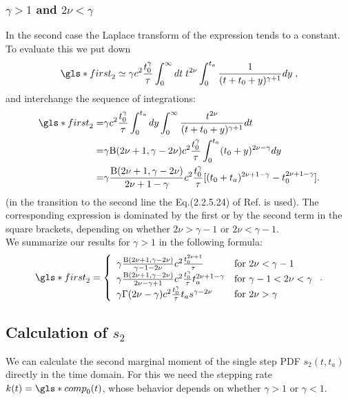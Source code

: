 \subsubsection{$\gamma>1$ and $2\nu < \gamma$}
In the second case the Laplace transform of the expression tends to a constant. To evaluate this we put down 
\begin{equation}
 \gls*{first}_2 \simeq  \gamma c^2 \frac{t_0^\gamma}{\tau} \int_0^\infty dt \; t^{2\nu} \int_0^{t_a} \frac{1}{(t+t_0+y)^{\gamma+1}} dy \; ,
\end{equation}
and interchange the sequence of integrations:
\begin{align}
 \gls*{first}_2 =& \gamma c^2 \frac{ t_0^\gamma}{\tau} \int_0^{t_a} dy \int_0^\infty \frac{t^{2\nu}}{(t+t_0+y)^{\gamma+1}} dt \nonumber \\
 =& \gamma \mathrm{B}(2\nu+1,\gamma - 2\nu) c^2 \frac{ t_0^\gamma}{\tau}  \int_0^{t_a} (t_0+y)^{2\nu -\gamma} dy \nonumber \\
 =& \gamma  \frac{\mathrm{B}(2\nu+1,\gamma - 2\nu) }{2 \nu +1- \gamma } c^2 \frac{t_0^\gamma}{\tau} [(t_0+t_a)^{2\nu +1- \gamma }-t_0^{2\nu+1 - \gamma }]. \nonumber
\end{align}
%
(in the transition to the second line the Eq.(2.2.5.24) of Ref. 
\cite{BryPr} 
is used). The corresponding expression is dominated by the first or by the second term in the square 
brackets, depending on whether $2\nu > \gamma -1$ or $2\nu < \gamma -1$. \\
We summarize our results for $\gamma > 1$ in the following formula:
\begin{equation}
 \gls*{first}_2 = \left\{
 \begin{array}{ll}
   \gamma \frac{\mathrm{B}(2\nu+1,\gamma - 2\nu)}{ \gamma -1 - 2 \nu} c^2 \frac{  t_0^{2\nu +1}}{\tau}  & \mbox{for } 2\nu < \gamma -1 \\
  \gamma \frac{\mathrm{B}(2\nu+1,\gamma - 2\nu)}{2 \nu - \gamma +1} c^2 \frac{ t_0^\gamma}{\tau} t_a^{2\nu +1- \gamma }  & \mbox{for } \gamma-1 < 2\nu < \gamma \\ 
 \gamma \Gamma(2\nu-\gamma) c^2 \frac{t_0^\gamma}{\tau} t_a s^{\gamma - 2\nu} & \mbox{for } 2\nu > \gamma 
 \end{array}
 \right. .
\end{equation}


\subsection*{Calculation of $s_2$}
We can calculate the second marginal moment of the single step PDF $s_{2}(t,t_a)$ directly in the time domain. For this we need the stepping rate $k(t)=\gls*{comp}_0(t)$, whose behavior depends on whether $\gamma>1$ or $\gamma<1$.

